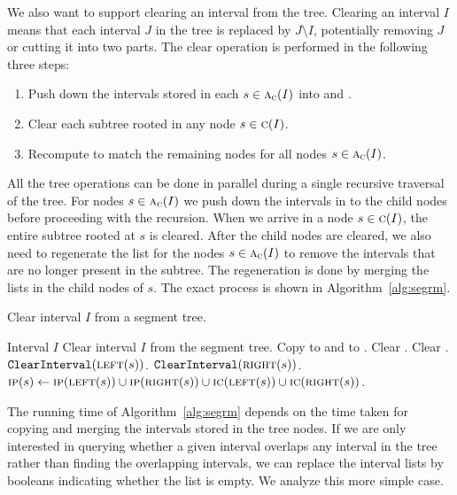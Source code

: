 \documentclass[english,gradu]{tktltiki2018}
\begin{document}
We also want to support clearing an interval from the tree.
Clearing an interval $I$ means that each interval $J$ in the tree is replaced by $J\setminus I$, potentially removing $J$ or cutting it into two parts.
The clear operation is performed in the following three steps:
\begin{enumerate}
\item Push down the intervals stored in each $s\in\textsc{a}_{\textsc{c}}(I)$ into  and .
\item Clear each subtree rooted in any node $s\in\textsc{c}(I)$.
\item Recompute  to match the remaining nodes for all nodes $s\in\textsc{a}_{\textsc{c}}(I)$.
\end{enumerate}

All the tree operations can be done in parallel during a single recursive traversal of the tree.
For nodes $s\in\textsc{a}_{\textsc{c}}(I)$ we push down the intervals in  to the child nodes before proceeding with the recursion.
When we arrive in a node $s\in\textsc{c}(I)$, the entire subtree rooted at $s$ is cleared.
After the child nodes are cleared, we also need to regenerate the  list for the nodes $s\in\textsc{a}_{\textsc{c}}(I)$ to remove the intervals that are no longer present in the subtree.
The regeneration is done by merging the lists in the child nodes of $s$.
The exact process is shown in Algorithm~\ref{alg:segrm}.

\begin{algorithm}
\caption{Clear interval $I$ from a segment tree.}\label{alg:segrm}
\begin{algorithmic}
\Require Interval $I$
\Ensure Clear interval $I$ from the segment tree.
		\State \Return
	\EndIf
		\State Copy  to  and to .
	\EndIf
	\State Clear .
	\State Clear .
		\State $\texttt{ClearInterval}(\textsc{left}(s))$.
		\State $\texttt{ClearInterval}(\textsc{right}(s))$.
	\EndIf
		\State $\textsc{ip}(s)\gets \textsc{ip}(\textsc{left}(s)) \cup \textsc{ip}(\textsc{right}(s)) \cup \textsc{ic}(\textsc{left}(s)) \cup \textsc{ic}(\textsc{right}(s))$.
	\EndIf
\EndProcedure
\end{algorithmic}
\end{algorithm}

The running time of Algorithm~\ref{alg:segrm} depends on the time taken for copying and merging the intervals stored in the tree nodes.
If we are only interested in querying whether a given interval overlaps any interval in the tree rather than finding the overlapping intervals, we can replace the interval lists by booleans indicating whether the list is empty.
We analyze this more simple case.
\end{document}
